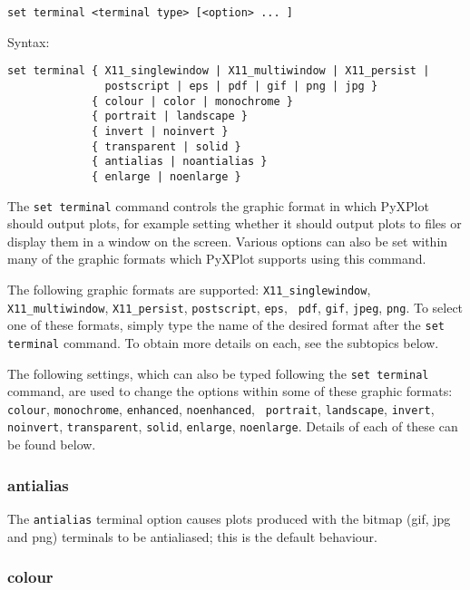 \begin{verbatim}
set terminal <terminal type> [<option> ... ]
\end{verbatim}

Syntax:

\begin{verbatim}
set terminal { X11_singlewindow | X11_multiwindow | X11_persist | 
               postscript | eps | pdf | gif | png | jpg } 
             { colour | color | monochrome } 
             { portrait | landscape } 
             { invert | noinvert } 
             { transparent | solid }
             { antialias | noantialias }
             { enlarge | noenlarge }
\end{verbatim}

The {\tt set terminal} command controls the graphic format in which PyXPlot
should output plots, for example setting whether it should output plots to files
or display them in a window on the screen. Various options can also be set
within many of the graphic formats which PyXPlot supports using this command.

The following graphic formats are supported:  {\tt X11\_singlewindow},
\newline\noindent %
{\tt X11\_multiwindow}, {\tt X11\_persist}, {\tt postscript}, {\tt eps}, {\tt
pdf}, {\tt gif}, {\tt jpeg}, {\tt png}. To select one of these formats, simply
type the name of the desired format after the {\tt set terminal} command. To
obtain more details on each, see the subtopics below.

The following settings, which can also be typed following the {\tt set terminal}
command, are used to change the options within some of these graphic formats:
{\tt colour}, {\tt monochrome}, {\tt enhanced}, {\tt noenhanced}, {\tt
portrait}, {\tt landscape}, {\tt invert}, {\tt noinvert}, {\tt transparent},
{\tt solid}, {\tt enlarge}, {\tt noenlarge}. Details of each of these can be
found below.

\subsubsection{antialias}

The {\tt antialias} terminal option causes plots produced with the bitmap (gif,
jpg and png) terminals to be antialiased; this is the default behaviour.

\subsubsection{colour}

